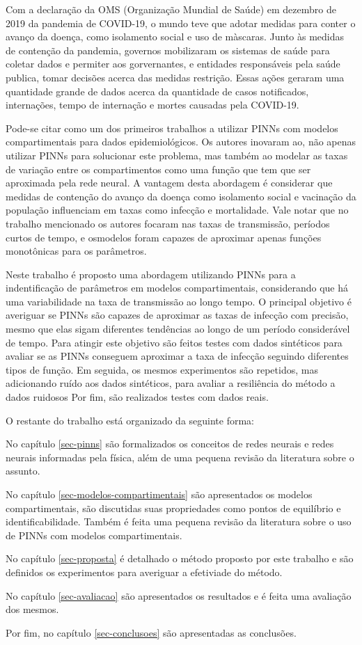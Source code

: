 Com a declaração da OMS (Organização Mundial de Saúde) em dezembro de 2019 da
pandemia de COVID-19, o mundo teve que adotar medidas para conter o avanço da 
doença, como isolamento social e uso de màscaras. Junto às medidas de contenção
da pandemia, governos mobilizaram os sistemas de saúde para coletar dados
e permiter aos gorvernantes, e entidades responsáveis pela saúde publica, 
tomar decisões acerca das medidas restrição.  
Essas ações geraram uma quantidade grande de dados acerca da quantidade de casos
notificados, internações, tempo de internação e mortes causadas pela COVID-19. 

Pode-se citar \cite{long-etal:21-L2} como um dos primeiros trabalhos a utilizar
PINNs com modelos compartimentais para dados epidemiológicos. Os autores inovaram 
ao, não apenas utilizar PINNs para solucionar este problema, mas também ao modelar 
as taxas de variação entre os compartimentos como uma função que tem que ser
aproximada pela rede neural. A vantagem desta abordagem é considerar que medidas
de contenção do avanço da doença como isolamento social e vacinação da população
influenciam em taxas como infecção e mortalidade. Vale notar que no trabalho
mencionado os autores focaram nas taxas de transmissão, períodos curtos de tempo,
e osmodelos foram capazes de aproximar apenas funções monotônicas para os parâmetros.   

Neste trabalho é proposto uma abordagem utilizando PINNs para a indentificação 
de parâmetros em modelos compartimentais, considerando que há uma variabilidade
na taxa de transmissão ao longo tempo. O principal objetivo é averiguar se PINNs
são capazes de aproximar as taxas de infecção com precisão, mesmo que elas  
sigam diferentes tendências ao longo de um período considerável de tempo.
Para atingir este objetivo são feitos testes com dados sintéticos para avaliar
se as PINNs conseguem aproximar a taxa de infecção seguindo diferentes tipos de
função. 
Em seguida, os mesmos experimentos são repetidos, mas adicionando ruído aos
dados sintéticos, para avaliar a resiliência do método a dados ruidosos
Por fim, são realizados testes com dados reais.

O restante do trabalho está organizado da seguinte forma: 

No capítulo \ref{sec-pinns} são formalizados os conceitos de redes neurais e 
redes neurais informadas pela física, além de uma pequena revisão da literatura
sobre o assunto. 

No capítulo \ref{sec-modelos-compartimentais} são apresentados os modelos compartimentais,
são discutidas suas propriedades como pontos de equilíbrio e identificabilidade.
Também é feita uma pequena revisão da literatura sobre o uso de PINNs com 
modelos compartimentais.


No capítulo \ref{sec-proposta} é detalhado o método proposto por este 
trabalho e são definidos os experimentos para averiguar a efetiviade
do método. 

No capítulo \ref{sec-avaliacao} são apresentados os resultados e 
é feita uma avaliação dos mesmos.

Por fim, no capítulo \ref{sec-conclusoes} são apresentadas as conclusões.    